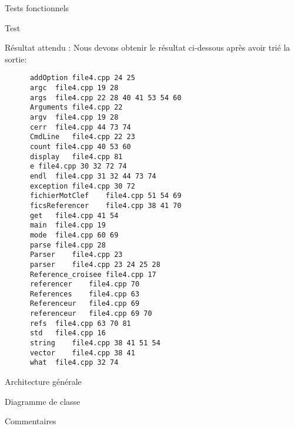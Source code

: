 \documentclass{article}
\begin{document}
\begin{section}{Tests fonctionnels}
\begin{subsection}{Test }
\begin{paragraph}{Résultat attendu :}
      Nous devons obtenir le résultat ci-dessous après avoir trié la sortie: 
      \begin{listing}[h!]
      \begin{verbatim}
	  addOption	file4.cpp 24 25	
	  argc	file4.cpp 19 28	
	  args	file4.cpp 22 28 40 41 53 54 60	
	  Arguments	file4.cpp 22	
	  argv	file4.cpp 19 28	
	  cerr	file4.cpp 44 73 74	
	  CmdLine	file4.cpp 22 23	
	  count	file4.cpp 40 53 60	
	  display	file4.cpp 81	
	  e	file4.cpp 30 32 72 74	
	  endl	file4.cpp 31 32 44 73 74	
	  exception	file4.cpp 30 72	
	  fichierMotClef	file4.cpp 51 54 69	
	  ficsReferencer	file4.cpp 38 41 70	
	  get	file4.cpp 41 54	
	  main	file4.cpp 19	
	  mode	file4.cpp 60 69	
	  parse	file4.cpp 28	
	  Parser	file4.cpp 23	
	  parser	file4.cpp 23 24 25 28	
	  Reference_croisee	file4.cpp 17	
	  referencer	file4.cpp 70	
	  References	file4.cpp 63	
	  Referenceur	file4.cpp 69	
	  referenceur	file4.cpp 69 70	
	  refs	file4.cpp 63 70 81	
	  std	file4.cpp 16	
	  string	file4.cpp 38 41 51 54	
	  vector	file4.cpp 38 41	
	  what	file4.cpp 32 74	
      \end{verbatim}
  
      \end{listing}
    \end{paragraph}
  \end{subsection}

\end{section}





\begin{section}{Architecture générale}

  \begin{subsection}{Diagramme de classe}
  \end{subsection}

  \begin{subsection}{Commentaires}
  \end{subsection}

\end{section}
\end{document}
